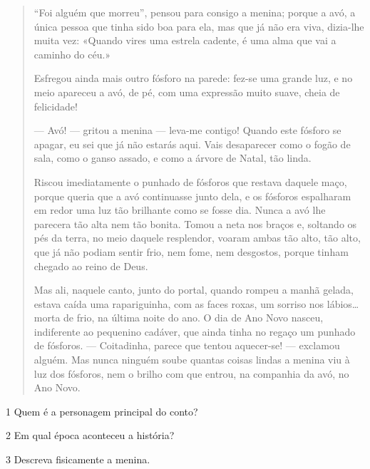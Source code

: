 \begin{quote}
``Foi alguém que morreu'', pensou para consigo a menina; porque a avó, a
única pessoa que tinha sido boa para ela, mas que já não era viva,
dizia-lhe muita vez: «Quando vires uma estrela cadente, é uma alma que
vai a caminho do céu.»

Esfregou ainda mais outro fósforo na parede: fez-se uma grande luz, e no
meio apareceu a avó, de pé, com uma expressão muito suave, cheia de
felicidade!

--- Avó! --- gritou a menina --- leva-me contigo! Quando este fósforo se
apagar, eu sei que já não estarás aqui. Vais desaparecer como o fogão de
sala, como o ganso assado, e como a árvore de Natal, tão linda.

Riscou imediatamente o punhado de fósforos que restava daquele maço,
porque queria que a avó continuasse junto dela, e os fósforos espalharam
em redor uma luz tão brilhante como se fosse dia. Nunca a avó lhe
parecera tão alta nem tão bonita. Tomou a neta nos braços e, soltando os
pés da terra, no meio daquele resplendor, voaram ambas tão alto, tão
alto, que já não podiam sentir frio, nem fome, nem desgostos, porque
tinham chegado ao reino de Deus.

Mas ali, naquele canto, junto do portal, quando rompeu a manhã gelada,
estava caída uma rapariguinha, com as faces roxas, um sorriso nos
lábios\ldots{} morta de frio, na última noite do ano. O dia de Ano Novo
nasceu, indiferente ao pequenino cadáver, que ainda tinha no regaço um
punhado de fósforos. --- Coitadinha, parece que tentou aquecer-se! ---
exclamou alguém. Mas nunca ninguém soube quantas coisas lindas a menina
viu à luz dos fósforos, nem o brilho com que entrou, na companhia da
avó, no Ano Novo.

\end{quote}

\num{1} Quem é a personagem principal do conto?


\num{2} Em qual época aconteceu a história?


\num{3} Descreva fisicamente a menina.


